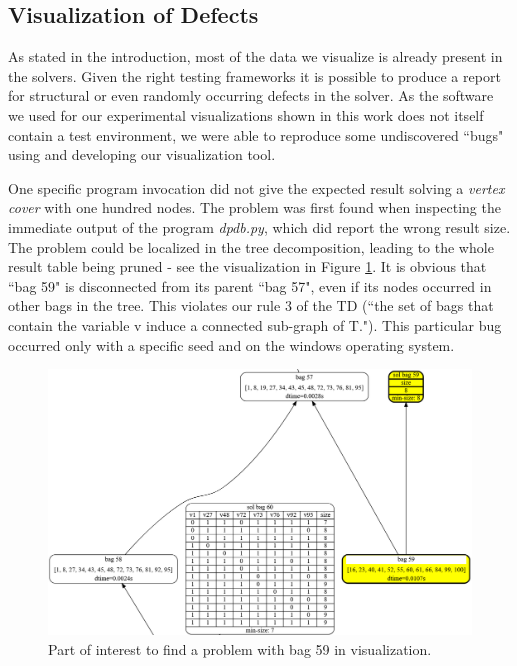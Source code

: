 \documentclass[a4paper, 12pt, bibliography=totoc]{scrartcl}
\begin{document}
\subsection{Visualization of Defects}
 
As stated in the introduction, most of the data we visualize is already present in the solvers.
Given the right testing frameworks it is possible to produce a report for structural or even randomly occurring defects in the solver. As the software we used for our experimental visualizations shown in this work does not itself contain a test environment, we were able to reproduce some undiscovered ``bugs" using and developing our visualization tool.


 One specific program invocation did not give the expected result solving a \textit{vertex cover} with one hundred nodes. The problem was first found when inspecting the immediate output of the program \textit{dpdb.py}, which did report the wrong result size. The problem could be localized in the tree decomposition, leading to the whole result table being pruned - see the visualization in Figure \ref{fig:starsbag59}. It is obvious that ``bag 59" is disconnected from its parent ``bag 57", even if its nodes occurred in other bags in the tree. This violates our rule $3$ of the TD (``the set of bags that contain the variable v induce a connected sub-graph of T.").  This particular bug occurred only with a specific seed and on the windows operating system. 

\begin{figure}[H]
	\centering
	\vspace{1em}
	\includegraphics[width=0.9\linewidth,height=0.9\textheight,keepaspectratio
					]{images/starsbag59.png}
		\vspace{1em}
	\caption{Part of interest to find a problem with bag 59 in visualization. }
	\label{fig:starsbag59}
\end{figure}
\end{document}
